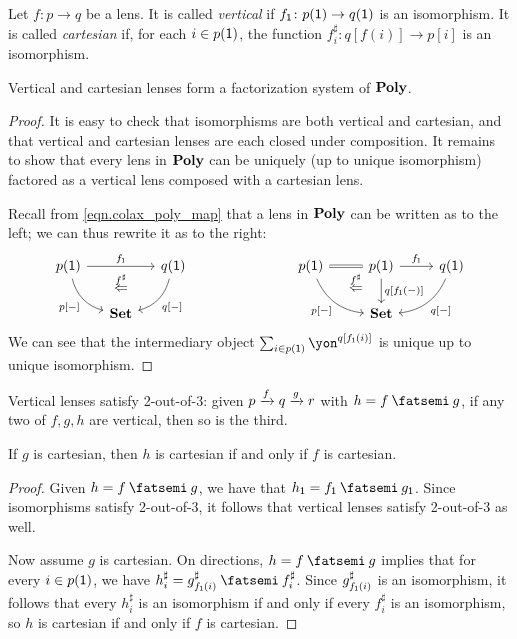 \documentclass[Book-Poly]{subfiles}
\begin{document}
\begin{definition} \label{def.vert_cart}
Let $f\colon p\to q$ be a lens.
It is called \emph{vertical} if $f_{\textsf{1}}\colon p(\textsf{1})\to q(\textsf{1})$ is an isomorphism.
It is called \emph{cartesian} if, for each $i\in p(\textsf{1})$, the function $f^\sharp_i\colon q[f(i)]\to p[i]$ is an isomorphism.
\end{definition}

\begin{proposition}\label{prop.vert_cart_factorization}
Vertical and cartesian lenses form a factorization system of $\mathbf{Poly}$.
\end{proposition}
\begin{proof}
It is easy to check that isomorphisms are both vertical and cartesian, and that vertical and cartesian lenses are each closed under composition.
It remains to show that every lens in $\mathbf{Poly}$ can be uniquely (up to unique isomorphism) factored as a vertical lens composed with a cartesian lens.

Recall from \eqref{eqn.colax_poly_map} that a lens in $\mathbf{Poly}$ can be written as to the left; we can thus rewrite it as to the right:
\[
\begin{tikzcd}[column sep=small]
	p(\1)\ar[dr, bend right, "{p[-]}"']\ar[rr, "f_\1"]&~&
	q(\1)\ar[dl, bend left, "{q[-]}"]\\&
	\smset\ar[u, phantom, near end, "\overset{f^\sharp}{\Leftarrow}"]
\end{tikzcd}
\hspace{1in}
\begin{tikzcd}
	p(\1)\ar[dr, bend right, "{p[-]}"']\ar[r, equal, ""' name=equal]&
	p(\1)\ar[d, "{q[f_\1(-)]}"]\ar[r, "f_\1"]&
	q(\1)\ar[dl, bend left, "{q[-]}"]\\&
	|[alias=set]|\smset\ar[from=equal, to=set, pos=.3, phantom, "\overset{f^\sharp}{\Leftarrow}"]
\end{tikzcd}
\]
We can see that the intermediary object $\sum_{i\in p(\1)} \yon^{q[f_\1(i)]}$ is unique up to unique isomorphism.
\end{proof}

\begin{proposition}
Vertical lenses satisfy 2-out-of-3: given $p\xrightarrow{f}q\xrightarrow{g}r$ with $h = f \then g$, if any two of $f,g,h$ are vertical, then so is the third.

If $g$ is cartesian, then $h$ is cartesian if and only if $f$ is cartesian.
\end{proposition}
\begin{proof}
Given $h = f \then g$, we have that $h_\1 = f_\1 \then g_\1$.
Since isomorphisms satisfy 2-out-of-3, it follows that vertical lenses satisfy 2-out-of-3 as well.

Now assume $g$ is cartesian.
On directions, $h = f \then g$ implies that for every $i \in p(\textsf{1})$, we have $h^\sharp_i = g^\sharp_{f_\1(i)} \then f^\sharp_i$.
Since $g^\sharp_{f_{\textsf{1}}(i)}$ is an isomorphism, it follows that every $h^\sharp_i$ is an isomorphism if and only if every $f^\sharp_i$ is an isomorphism, so $h$ is cartesian if and only if $f$ is cartesian.
\end{proof}
\end{document}
